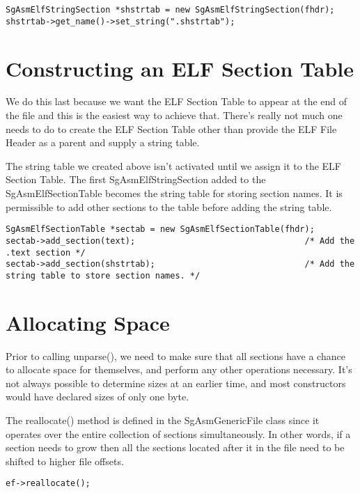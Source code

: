 \begin{verbatim}
SgAsmElfStringSection *shstrtab = new SgAsmElfStringSection(fhdr);
shstrtab->get_name()->set_string(".shstrtab");
\end{verbatim}

\section{Constructing an ELF Section Table}

We do this last because we want the ELF Section Table to appear at the
end of the file and this is the easiest way to achieve that. There's
really not much one needs to do to create the ELF Section Table other
than provide the ELF File Header as a parent and supply a string
table.

The string table we created above isn't activated until we assign it
to the ELF Section Table. The first SgAsmElfStringSection added to the
SgAsmElfSectionTable becomes the string table for storing section
names. It is permissible to add other sections to the table before
adding the string table.

\begin{verbatim}
SgAsmElfSectionTable *sectab = new SgAsmElfSectionTable(fhdr);
sectab->add_section(text);                                  /* Add the .text section */
sectab->add_section(shstrtab);                              /* Add the string table to store section names. */
\end{verbatim}

\section{Allocating Space}

Prior to calling unparse(), we need to make sure that all sections
have a chance to allocate space for themselves, and perform any other
operations necessary. It's not always possible to determine sizes at
an earlier time, and most constructors would have declared sizes of
only one byte.

The reallocate() method is defined in the SgAsmGenericFile class since
it operates over the entire collection of sections simultaneously. In
other words, if a section needs to grow then all the sections located
after it in the file need to be shifted to higher file offsets.

\begin{verbatim}
ef->reallocate();
\end{verbatim}

